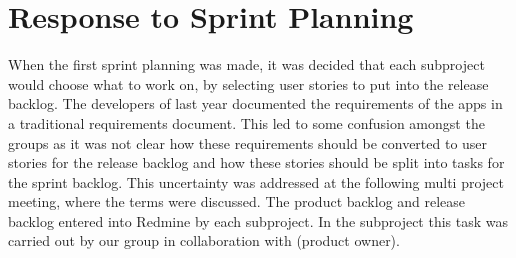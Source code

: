 \section{Response to Sprint Planning}\label{sec:s1p_response}
When the first sprint planning was made, it was decided that each subproject would choose what to work on, by selecting user stories to put into the release backlog. The developers of last year documented the requirements of the apps in a traditional requirements document. This led to some confusion amongst the groups as it was not clear how these requirements should be converted to user stories for the release backlog and how these stories should be split into tasks for the sprint backlog. This uncertainty was addressed at the following multi project meeting, where the terms were discussed. The product backlog and release backlog entered into Redmine by each subproject. In the \bd subproject this task was carried out by our group in collaboration with  (\bd product owner).